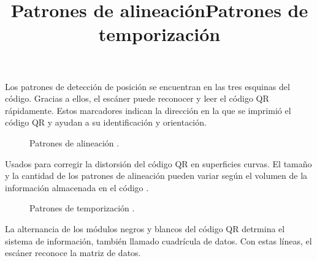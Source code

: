 Los patrones de detección de posición se encuentran en las tres esquinas del código. Gracias a ellos, el escáner puede reconocer y leer el código QR rápidamente. Estos marcadores indican la dirección en la que se imprimió el código QR y ayudan a su identificación y orientación. \\

\title{Patrones de alineación}

\begin{figure}[htbp]
	\begin{center}
		\caption{Patrones de alineación \cite{CitaA01}.}
		\label{fig:Patrones de alineacion1}
	\end{center}
\end{figure}

Usados para corregir la distorsión del código QR en superficies curvas. El tamaño y la cantidad de los patrones de alineación pueden variar según el volumen de la información almacenada en el código \cite{CitaA01}. \\

\title{Patrones de temporización}

\begin{figure}[htbp]
	\begin{center}
		\caption{Patrones de temporización \cite{CitaA01}.}
		\label{fig:temporizacion}
	\end{center}
\end{figure}

La alternancia de los módulos negros y blancos del código QR detrmina el sistema de información, también llamado cuadrícula de datos. Con estas líneas, el escáner reconoce la matriz de datos. 

\newpage

